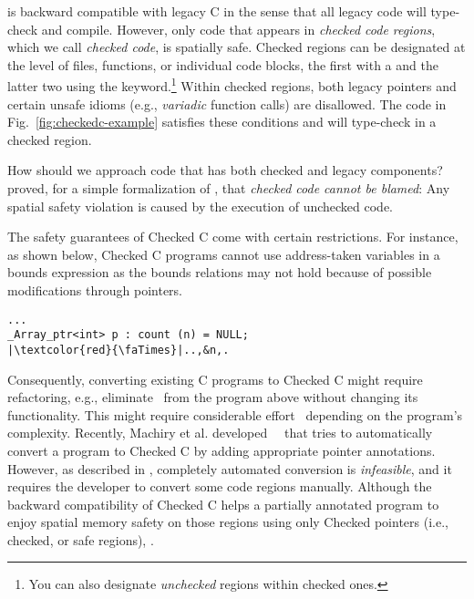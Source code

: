 %
\checkedc is backward compatible with legacy C in the sense that all legacy code
will type-check and compile. However, only code that appears in \emph{checked
  code regions}, which we call \emph{checked code}, is spatially safe. Checked
regions can be designated at the level of files, functions, or individual code
blocks, the first with a  and the latter two using the
 keyword.\footnote{You can also designate \emph{unchecked} regions
  within checked ones.}  Within checked regions, both legacy pointers and
certain unsafe idioms (e.g., \emph{variadic} function calls) are disallowed. The
code in Fig.~\ref{fig:checkedc-example} satisfies these conditions and will
type-check in a checked region.

How should we approach code that has both checked and legacy components?
\citet{li22checkedc} proved, for a simple formalization of \checkedc, that
\emph{checked code cannot be blamed}: Any spatial safety violation is caused by
the execution of unchecked code.
%
% 
% 

%
The safety guarantees of Checked C come with certain restrictions. For instance,
as shown below, Checked C programs cannot use address-taken variables in a
bounds expression as the bounds relations may not hold because of possible
modifications through pointers.
% 
\begin{verbatim}
...
_Array_ptr<int> p : count (n) = NULL;
|\textcolor{red}{\faTimes}|..,&n,.
\end{verbatim}
% 
Consequently, converting existing C programs to Checked C might require
refactoring, e.g., eliminate~ from the program above without
changing its functionality.
% 
This might require considerable effort~\cite{duanrefactoring} depending on the
program's complexity.
% 
Recently, Machiry et al. developed~\threec~\cite{machiry2022c} that tries to
automatically convert a program to Checked C by adding appropriate pointer
annotations.  However, as described in \threec, completely automated conversion
is \emph{infeasible}, and it requires the developer to convert some code regions
manually.  
% 
Although the backward compatibility of Checked C helps a partially annotated
program to enjoy spatial memory safety on those regions using only Checked
pointers (i.e., checked, or safe regions), .

